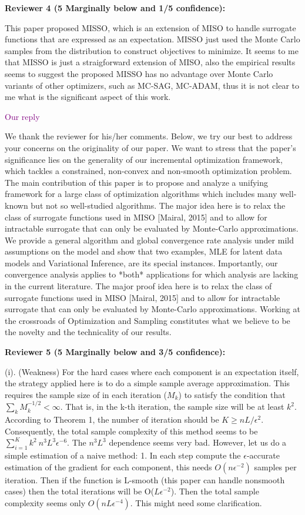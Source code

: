 \documentclass{article} %
\theoremstyle{t}
\begin{document}
\textbf{Reviewer 4 (5 Marginally below and 1/5 confidence):}

This paper proposed MISSO, which is an extension of MISO to handle surrogate functions that are expressed as an expectation. MISSO just used the Monte Carlo samples from the distribution to construct objectives to minimize.
It seems to me that MISSO is just a straigforward extension of MISO, also the empirical results seems to suggest the proposed MISSO has no advantage over Monte Carlo variants of other optimizers, such as MC-SAG, MC-ADAM, thus it is not clear to me what is the significant aspect of this work.


\textcolor{purple}{Our reply}

We thank the reviewer for his/her comments. Below, we try our best to address your concerns on the originality of our paper.   
We want to stress that the paper's significance lies on the generality of our incremental optimization framework, which tackles a constrained, non-convex and non-smooth optimization problem. 
The main contribution of this paper is to propose and analyze a unifying framework for a large class of optimization algorithms which includes many well-known but not so well-studied algorithms.
The major idea here is to relax the class of surrogate functions used in MISO [Mairal, 2015] and to allow for intractable surrogate that can only be evaluated by Monte-Carlo approximations.
We provide a general algorithm and global convergence rate analysis under mild assumptions on the model and show that two examples, MLE for latent data models and Variational Inference, are its special instances. Importantly, our convergence analysis applies to *both* applications for which analysis are lacking in the current literature. 
The major proof idea here is to relax the class of surrogate functions used in MISO [Mairal, 2015] and to allow for intractable surrogate that can only be evaluated by Monte-Carlo approximations. Working at the crossroads of Optimization and Sampling constitutes what we believe to be the novelty and the technicality of our results.



\textbf{Reviewer 5 (5 Marginally below and 3/5 confidence):}

(i). (Weakness) For the hard cases where each component is an expectation itself, the strategy applied here is to do a simple sample average approximation. This requires the sample size of in each iteration ($M_k$) to satisfy the condition that $\sum_k M_k^{-1/2}<\infty$. That is, in the k-th iteration, the sample size will be at least $k^2$. According to Theorem 1, the number of iteration should be $K\geq nL/\epsilon^2$. Consequently, the total sample complexity of this method seems to be $ \sum_{i=1}^{K} k^2 ~ n^3L^3\epsilon^{-6}$. The 
$n^3L^3$ dependence seems very bad. However, let us do a simple estimation of a naive method: 1. In each step compute the $\epsilon$-accurate estimation of the gradient for each component, this needs $O(n \epsilon^{-2})$ samples per iteration. Then if the function is L-smooth (this paper can handle nonsmooth cases) then the total iterations will be O($L\epsilon^{-2}$). Then the total sample complexity seems only $O(nL\epsilon^{-4})$. This might need some clarification.
 
\end{document}
